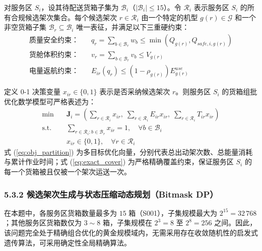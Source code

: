 \documentclass[12pt,a4paper,UTF8]{ctexart}
\begin{document}
对服务区 $S_i$，设其待配送货箱子集为 $\mathcal{B}_i$（$|\mathcal{B}_i| \le 15$）。令 $\mathcal{R}_i$ 表示服务区 $S_i$ 的所有合规候选架次集合。每个候选架次 $r \in \mathcal{R}_i$ 由一个特定的机型 $g(r) \in \mathcal{G}$ 和一个非空货箱子集 $\mathcal{B}_r \subseteq \mathcal{B}_i$ 唯一表征，并满足以下三重硬约束：
\begin{align}
\text{质量安全约束：} \quad & q_r = \sum_{b \in \mathcal{B}_r} w_b \le \min\left(Q_{g(r)}, Q_{safe, i, g(r)}\right) \\
\text{货舱体积约束：} \quad & v_r = \sum_{b \in \mathcal{B}_r} v_b \le V_{g(r)} \\
\text{电量返航约束：} \quad & E_{ir}(q_r) \le (1 - \rho_{g(r)}) E_{g(r)}^{use}
\end{align}

定义 0-1 决策变量 $x_{ir} \in \{0, 1\}$ 表示是否采纳候选架次 $r$。则服务区 $S_i$ 的货箱组批优化数学模型可严格表述为：
\begin{align}
\min \quad & \bm{J}_i = \left( \sum_{r \in \mathcal{R}_i} x_{ir}, \; \sum_{r \in \mathcal{R}_i} E_{ir} x_{ir}, \; \sum_{r \in \mathcal{R}_i} T_{ir} x_{ir} \right) \label{eq:obj_partition} \\
\text{s.t.} \quad & \sum_{r \in \mathcal{R}_i : b \in \mathcal{B}_r} x_{ir} = 1, \quad \forall b \in \mathcal{B}_i \label{eq:exact_cover} \\
& x_{ir} \in \{0, 1\}, \quad \forall r \in \mathcal{R}_i
\end{align}
式 (\ref{eq:obj_partition}) 为多目标优化向量，分别代表总出动架次数、总能量消耗与累计作业时间；式 (\ref{eq:exact_cover}) 为严格精确覆盖约束，保证服务区 $S_i$ 的每一个货箱被且仅被一个架次运送一次。

\subsubsection{5.3.2 候选架次生成与状态压缩动态规划（Bitmask DP）}
在本题中，各服务区货箱数量最多为 $15$ 箱（S001），子集规模最大为 $2^{15} = 32\,768$；其他服务区货箱数仅为 $3\sim 8$ 箱，子集规模在 $2^3 = 8$ 至 $2^8 = 256$ 之间。因此，该问题完全处于精确组合优化的黄金规模域内，无需采用存在收敛随机性的启发式遗传算法，可采用确定性全局精确算法。
\end{document}

